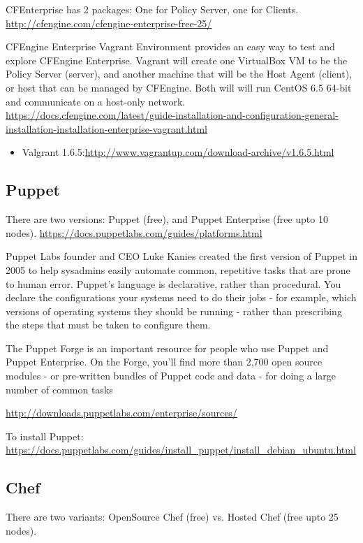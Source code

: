 CFEnterprise has 2 packages: One for Policy Server, one for Clients.
\url{http://cfengine.com/cfengine-enterprise-free-25/}

CFEngine Enterprise Vagrant Environment provides an easy way to test and explore
CFEngine Enterprise. Vagrant will create one VirtualBox VM to be the Policy
Server (server), and another machine that will be the Host Agent (client), or
host that can be managed by CFEngine.   Both will will run CentOS 6.5 64-bit and
communicate on a host-only network.
\url{https://docs.cfengine.com/latest/guide-installation-and-configuration-general-installation-installation-enterprise-vagrant.html}
\begin{itemize}
  \item Valgrant
  1.6.5:\url{http://www.vagrantup.com/download-archive/v1.6.5.html}
\end{itemize}

\subsection{Puppet}

There are two versions: Puppet (free), and Puppet Enterprise (free upto 10
nodes). \url{https://docs.puppetlabs.com/guides/platforms.html}

Puppet Labs founder and CEO Luke Kanies created the first version of Puppet in
2005 to help sysadmins easily automate common, repetitive tasks that are prone to human error. 
Puppet's language is declarative, rather than procedural. You declare the
configurations your systems need to do their jobs - for example, which versions
of operating systems they should be running - rather than prescribing the steps
that must be taken to configure them.  


The Puppet Forge is an important resource for people who use Puppet and Puppet
Enterprise. On the Forge, you'll find more than 2,700 open source modules - or
pre-written bundles of Puppet code and data - for doing a large number of common tasks

\url{http://downloads.puppetlabs.com/enterprise/sources/} 

To install Puppet:
\url{https://docs.puppetlabs.com/guides/install_puppet/install_debian_ubuntu.html}

\subsection{Chef}

There are two variants: OpenSource Chef (free) vs. Hosted Chef (free upto 25
nodes). 

